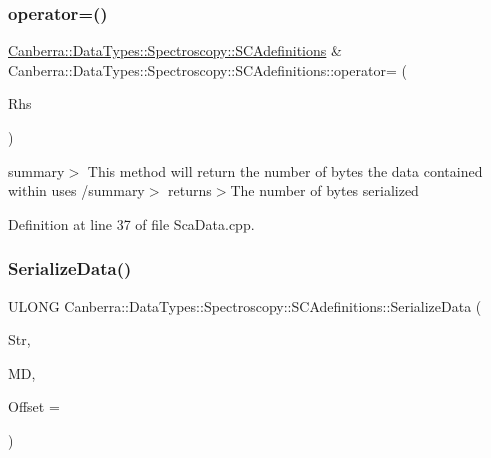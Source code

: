 \subsubsection{\texorpdfstring{operator=()}{operator=()}}
{\footnotesize\ttfamily \hyperlink{class_canberra_1_1_data_types_1_1_spectroscopy_1_1_s_c_adefinitions}{Canberra\+::\+Data\+Types\+::\+Spectroscopy\+::\+S\+C\+Adefinitions} \& Canberra\+::\+Data\+Types\+::\+Spectroscopy\+::\+S\+C\+Adefinitions\+::operator= (\begin{DoxyParamCaption}\item[{const \hyperlink{class_canberra_1_1_data_types_1_1_spectroscopy_1_1_s_c_adefinitions}{S\+C\+Adefinitions} \&}]{Rhs }\end{DoxyParamCaption})}

summary$>$ This method will return the number of bytes the data contained within uses /summary$>$ returns$>$The number of bytes serialized

Definition at line 37 of file Sca\+Data.\+cpp.

\mbox{\label{class_canberra_1_1_data_types_1_1_spectroscopy_1_1_s_c_adefinitions_a6313646516bbf922f990c2d90b4166a3_a6313646516bbf922f990c2d90b4166a3}} 
\subsubsection{\texorpdfstring{Serialize\+Data()}{SerializeData()}}
{\footnotesize\ttfamily U\+L\+O\+NG Canberra\+::\+Data\+Types\+::\+Spectroscopy\+::\+S\+C\+Adefinitions\+::\+Serialize\+Data (\begin{DoxyParamCaption}\item[{\hyperlink{class_canberra_1_1_utility_1_1_core_1_1_byte_stream}{Canberra\+::\+Utility\+::\+Core\+::\+Byte\+Stream} \&}]{Str,  }\item[{const \hyperlink{class_canberra_1_1_serialization_1_1_meta_data}{Canberra\+::\+Serialization\+::\+Meta\+Data} \&}]{MD,  }\item[{const L\+O\+NG}]{Offset = {} }\end{DoxyParamCaption})\hspace{0.3cm}{\ttfamily [virtual]}}

